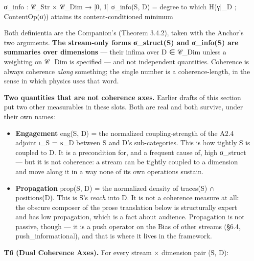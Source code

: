 \documentclass[11pt, openany]{book}
\begin{document}
\begin{Code}
σ_info : 𝒞_Str × 𝒞_Dim → [0, 1]
σ_info(S, D) = degree to which H(γ|_D ; ContentOp(σ)) attains its content-conditioned minimum
\end{Code}

Both definientia are the Companion's (Theorem 3.4.2), taken with the Anchor's two arguments. \textbf{The stream-only forms σ\_\allowbreak{}struct(S) and σ\_\allowbreak{}info(S) are summaries over dimensions} --- their infima over D ∈ 𝒞\_\allowbreak{}Dim unless a weighting on 𝒞\_\allowbreak{}Dim is specified --- and not independent quantities. Coherence is always coherence \textit{along} something; the single number is a coherence-length, in the sense in which physics uses that word.

\textbf{Two quantities that are not coherence axes.} Earlier drafts of this section put two other measurables in these slots. Both are real and both survive, under their own names:

\begin{itemize}
\item \textbf{Engagement} eng(S, D) = the normalized coupling-strength of the A2.4 adjoint ι\_\allowbreak{}S ⊣ κ\_\allowbreak{}D between S and D's sub-categories. This is how tightly S is coupled to D. It is a precondition for, and a frequent cause of, high σ\_\allowbreak{}struct --- but it is not coherence: a stream can be tightly coupled to a dimension and move along it in a way none of its own operations sustain.
\item \textbf{Propagation} prop(S, D) = the normalized density of traces(S) ∩ positions(D). This is S's \textit{reach} into D. It is not a coherence measure at all: the obscure composer of the prose translation below is structurally expert and has low propagation, which is a fact about audience. Propagation is not passive, though --- it is a push operator on the Bias of other streams (§6.4, push\_\allowbreak{}informational), and that is where it lives in the framework.
\end{itemize}

\textbf{T6 (Dual Coherence Axes).} For every stream × dimension pair (S, D):
\end{document}

